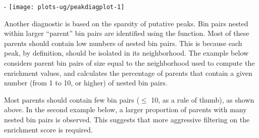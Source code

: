 \documentclass{report}\usepackage[]{graphicx}\usepackage[usenames,dvipsnames]{color}
\makeatletter
\def\maxwidth{ %
  \ifdim\Gin@nat@width>\linewidth
    \linewidth
  \else
    \Gin@nat@width
  \fi
}
\newcommand{\hlnum}[1]{\textcolor[rgb]{0.816,0.125,0.439}{#1}}%
\newcommand{\hlstr}[1]{\textcolor[rgb]{0.251,0.627,0.251}{#1}}%
\newcommand{\hlcom}[1]{\textcolor[rgb]{0.502,0.502,0.502}{\textit{#1}}}%
\newcommand{\hlopt}[1]{\textcolor[rgb]{0,0,0}{#1}}%
\newcommand{\hlstd}[1]{\textcolor[rgb]{0.251,0.251,0.251}{#1}}%
\newcommand{\hlkwb}[1]{\textcolor[rgb]{0,0,0}{#1}}%
\newcommand{\hlkwc}[1]{\textcolor[rgb]{0.251,0.251,0.251}{#1}}%
\newcommand{\hlkwd}[1]{\textcolor[rgb]{0.878,0.439,0.125}{#1}}%
\newenvironment{knitrout}{}{} %
\makeatother
\begin{document}
\begin{knitrout}
\color{fgcolor}\begin{adjustwidth}{0mm}{-\fltoffset}
\texttt{[image: plots-ug/peakdiagplot-1]} \end{adjustwidth}
\end{knitrout}

Another diagnostic is based on the sparsity of putative peaks.
Bin pairs nested within larger ``parent'' bin pairs are identified using the  function.
Most of these parents should contain low numbers of nested bin pairs.
This is because each peak, by definition, should be isolated in its neighborhood.
The example below considers parent bin pairs of size equal to the neighborhood used to compute the enrichment values,
and calculates the percentage of parents that contain a given number (from 1 to 10, or higher) of nested bin pairs.

\begin{knitrout}
\color{fgcolor}
\end{knitrout}

Most parents should contain few bin pairs ($\le$ 10, as a rule of thumb), as shown above.
In the second example below, a larger proportion of parents with many nested bin pairs is observed.
This suggests that more aggressive filtering on the enrichment score is required.
\end{document}
